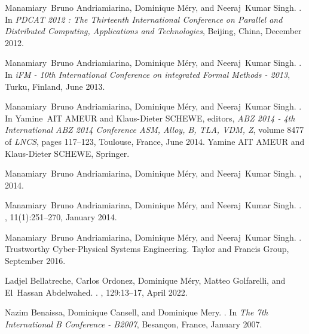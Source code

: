 \documentclass[ 12pt]{article}
\begin{document}
\begin{thebibliography}{100}
Manamiary~Bruno Andriamiarina, Dominique M{\'e}ry, and Neeraj~Kumar Singh.
.
\newblock In {\em {PDCAT 2012 : The Thirteenth International Conference on
  Parallel and Distributed Computing, Applications and Technologies}}, Beijing,
  China, December 2012.

Manamiary~Bruno Andriamiarina, Dominique M{\'e}ry, and Neeraj~Kumar Singh.
.
\newblock In {\em {iFM - 10th International Conference on integrated Formal
  Methods - 2013}}, Turku, Finland, June 2013.

Manamiary~Bruno Andriamiarina, Dominique M{\'e}ry, and Neeraj~Kumar Singh.
.
\newblock In Yamine~AIT AMEUR and Klaus-Dieter SCHEWE, editors, {\em {ABZ 2014
  - 4th International ABZ 2014 Conference ASM, Alloy, B, TLA, VDM, Z}}, volume
  8477 of {\em LNCS}, pages 117--123, Toulouse, France, June 2014. {Yamine AIT
  AMEUR and Klaus-Dieter SCHEWE}, {Springer}.

Manamiary~Bruno Andriamiarina, Dominique M{\'e}ry, and Neeraj~Kumar Singh.
,
  2014.

Manamiary~Bruno Andriamiarina, Dominique M{\'e}ry, and Neeraj~Kumar Singh.
.
, 11(1):251--270,
  January 2014.

Manamiary~Bruno Andriamiarina, Dominique M{\'e}ry, and Neeraj~Kumar Singh.
.
\newblock Trustworthy Cyber-Physical Systems Engineering. {Taylor and Francis
  Group}, September 2016.

Ladjel Bellatreche, Carlos Ordonez, Dominique M{\'e}ry, Matteo Golfarelli, and
  El~Hassan Abdelwahed.
.
, 129:13--17, April 2022.

Nazim Benaissa, Dominique Cansell, and Dominique Mery.
.
\newblock In {\em {The 7th International B Conference - B2007}}, Besan{\c c}on,
  France, January 2007.


\end{thebibliography}
\end{document}
